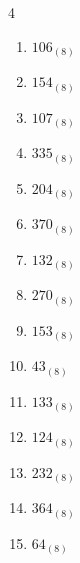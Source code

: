 \begin{multicols}{4}
\begin{enumerate}
\columnbreak %

  \item $106_{(8)}$

        \phantom{$=70$}

  \item $154_{(8)}$

        \phantom{$=108$}

  \item $107_{(8)}$

        \phantom{$=71$}

  \item $335_{(8)}$

        \phantom{$=221$}

  \item $204_{(8)}$

        \phantom{$=132$}

  \item $370_{(8)}$

        \phantom{$=248$}

  \item $132_{(8)}$

        \phantom{$=90$}

  \item $270_{(8)}$

        \phantom{$=184$}

  \item $153_{(8)}$

        \phantom{$=107$}

  \item $43_{(8)}$

        \phantom{$=35$}

  \item $133_{(8)}$

        \phantom{$=91$}

  \item $124_{(8)}$

        \phantom{$=84$}

  \item $232_{(8)}$

        \phantom{$=154$}

  \item $364_{(8)}$

        \phantom{$=244$}

  \item $64_{(8)}$

        \phantom{$=52$}

\columnbreak %


\end{enumerate}
\end{multicols}
